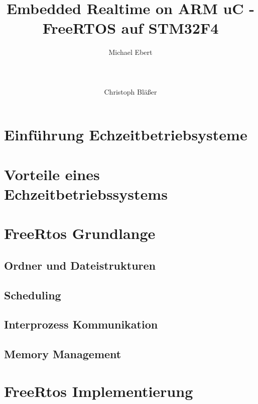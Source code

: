 \documentclass[ngerman]{seminarvorlage}
\begin{document}
\title{Embedded Realtime on ARM uC - FreeRTOS auf STM32F4}
\author{
  \alignauthor Michael Ebert\\
    \\
		\\
    \\
  \alignauthor Christoph Bläßer\\
}

\maketitle



\section{Einführung Echzeitbetriebsysteme}
\section{Vorteile eines Echzeitbetriebssystems}
\section{FreeRtos Grundlange} 
\subsection{Ordner und Dateistrukturen} 
\subsection{Scheduling}
\subsection{Interprozess Kommunikation}
\subsection{Memory Management}
\section{FreeRtos Implementierung} 
\end{document}
